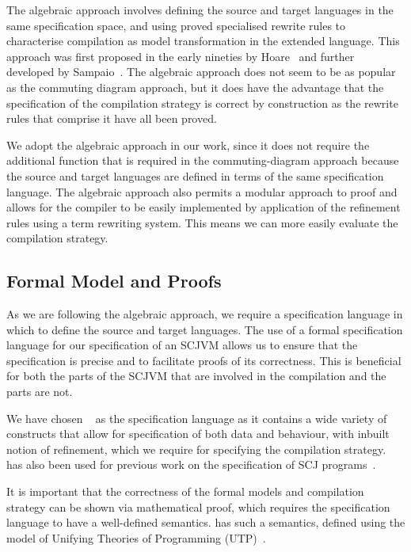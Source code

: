 The algebraic approach involves defining the source and target
languages in the same specification space, and using proved
specialised rewrite rules to characterise compilation as model
transformation in the extended language.
This approach was first proposed in the early nineties by
Hoare~\cite{hoare1991} and further developed by
Sampaio~\cite{hoare1993, sampaio1993}.
The algebraic approach does not seem to be as popular as the commuting
diagram approach, but it does have the advantage that the
specification of the compilation strategy is correct by construction
as the rewrite rules that comprise it have all been proved.

We adopt the algebraic approach in our work, since it does not require
the additional function that is required in the commuting-diagram
approach because the source and target languages are defined in terms
of the same specification language.
The algebraic approach also permits a modular approach to proof and
allows for the compiler to be easily implemented by application of the
refinement rules using a term rewriting system.
This means we can more easily evaluate the compilation strategy.

\subsection{Formal Model and Proofs}

As we are following the algebraic approach, we require a specification
language in which to define the source and target languages.
The use of a formal specification language for our specification of an
SCJVM allows us to ensure that the specification is precise and to
facilitate proofs of its correctness.
This is beneficial for both the parts of the SCJVM that are involved
in the compilation and the parts are not.

We have chosen \Circus{}~\cite{oliveira2009} as the specification
language as it contains a wide variety of constructs that allow for
specification of both data and behaviour, with 
inbuilt notion of refinement, which we require for specifying the
compilation strategy.
\Circus{} has also been used for previous work on the specification of
SCJ programs~\cite{cavalcanti2011, cavalcanti2013}.

It is important that the correctness of the formal models and
compilation strategy can be shown via mathematical proof, which
requires the specification language to have a well-defined semantics.
\Circus{} has such a semantics, defined using the model of Unifying
Theories of Programming (UTP)~\cite{hoare1998}.

